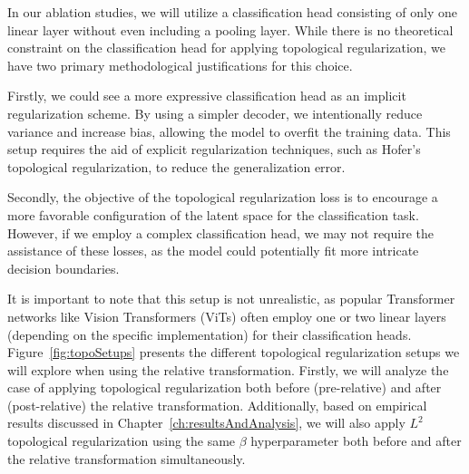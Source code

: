 \documentclass[../main.tex]{subfiles}
\begin{document}
In our ablation studies, we will utilize a classification head consisting of only one linear layer without even including a pooling layer. While there is no theoretical constraint on the classification head for applying topological regularization, we have two primary methodological justifications for this choice.

Firstly, we could see a more expressive classification head as an implicit regularization scheme. By using a simpler decoder, we intentionally reduce variance and increase bias, allowing the model to overfit the training data. This setup requires the aid of explicit regularization techniques, such as Hofer's topological regularization, to reduce the generalization error.

Secondly, the objective of the topological regularization loss is to encourage a more favorable configuration of the latent space for the classification task. However, if we employ a complex classification head, we may not require the assistance of these losses, as the model could potentially fit more intricate decision boundaries.

It is important to note that this setup is not unrealistic, as popular Transformer networks like Vision Transformers (ViTs) \cite{dosovitskiy_vit_2021} often employ one or two linear layers (depending on the specific implementation) for their classification heads.\\


Figure~\ref{fig:topoSetups} presents the different topological regularization setups we will explore when using the relative transformation. Firstly, we will analyze the case of applying topological regularization both before (pre-relative) and after (post-relative) the relative transformation. Additionally, based on empirical results discussed in Chapter~\ref{ch:resultsAndAnalysis}, we will also apply $L^2$ topological regularization using the same $\beta$ hyperparameter both before and after the relative transformation simultaneously.
\end{document}
